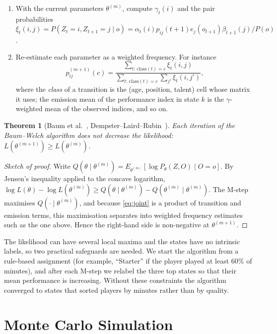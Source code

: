 \documentclass[11pt]{amsart}
\newtheorem{theorem}{Theorem}[section]
\theoremstyle{definition}
\theoremstyle{remark}
\begin{document}
\begin{enumerate}
\item[(E)] With the current parameters $\theta^{(m)}$, compute $\gamma_t(i)$ and the pair probabilities $\xi_t(i,j)=P(Z_t=i,Z_{t+1}=j\mid o)=\alpha_t(i)p_{ij}(t+1)e_j(o_{t+1})\beta_{t+1}(j)/P(o)$.
\item[(M)] Re-estimate each parameter as a weighted frequency. For instance
\[
p^{(m+1)}_{ij}(c) = \frac{\sum_{t:\,\text{class}(t)=c}\xi_t(i,j)}{\sum_{t:\,\text{class}(t)=c}\sum_{j'}\xi_t(i,j')},
\]
where the \emph{class} of a transition is the (age, position, talent) cell whose matrix it uses; the emission mean of the performance index in state $k$ is the $\gamma$-weighted mean of the observed indices, and so on.
\end{enumerate}

\begin{theorem}[Baum et al.~\cite{baum}, Dempster--Laird--Rubin~\cite{dlr}]\label{thm:em}
Each iteration of the Baum--Welch algorithm does not decrease the likelihood: $L(\theta^{(m+1)})\ge L(\theta^{(m)})$.
\end{theorem}

\begin{proof}[Sketch of proof]
Write $Q(\theta\mid\theta^{(m)})=E_{\theta^{(m)}}[\log P_\theta(Z,O)\mid O=o]$. By Jensen's inequality applied to the concave logarithm, $\log L(\theta)-\log L(\theta^{(m)})\ge Q(\theta\mid\theta^{(m)})-Q(\theta^{(m)}\mid\theta^{(m)})$. The M-step maximises $Q(\cdot\mid\theta^{(m)})$, and because \eqref{eq:joint} is a product of transition and emission terms, this maximisation separates into weighted frequency estimates such as the one above. Hence the right-hand side is non-negative at $\theta^{(m+1)}$.
\end{proof}

The likelihood can have several local maxima and the states have no intrinsic labels, so two practical safeguards are needed. We start the algorithm from a rule-based assignment (for example, ``Starter'' if the player played at least 60\% of minutes), and after each M-step we relabel the three top states so that their mean performance is increasing. Without these constraints the algorithm converged to states that sorted players by minutes rather than by quality.

\section{Monte Carlo Simulation}\label{sec:mc}
\end{document}
